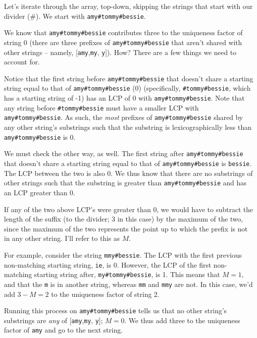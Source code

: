 \documentclass[11pt]{article}
\begin{document}
            Let's iterate through the array, top-down, skipping the strings that start with our divider (\#). We start with \verb|amy#tommy#bessie|.
            
            We know that \verb|amy#tommy#bessie| contributes three to the uniqueness factor of string 0 (there are three prefixes of \verb|amy#tommy#bessie| that aren't shared with other strings -- namely, [\verb|amy|,\verb|my|, \verb|y|]). How? There are a few things we need to account for.
            
            Notice that the first string before \verb|amy#tommy#bessie| that doesn't share a starting string equal to that of \verb|amy#tommy#bessie| (0) (specifically, \verb|#tommy#bessie|, which has a starting string of -1) has an LCP of 0 with \verb|amy#tommy#bessie|. Note that any string before \verb|#tommy#bessie| must have a smaller LCP with \verb|amy#tommy#bessie|. As such, the \textit{most} prefixes of \verb|amy#tommy#bessie| shared by any other string's substrings such that the substring is lexicographically less than \verb|amy#tommy#bessie| is 0.
            
            We must check the other way, as well. The first string after \verb|amy#tommy#bessie| that doesn't share a starting string equal to that of \verb|amy#tommy#bessie| is \verb|bessie|. The LCP between the two is also 0. We thus know that there are no substrings of other strings such that the substring is greater than \verb|amy#tommy#bessie| and has an LCP greater than 0.
            
            If any of the two above LCP's were greater than 0, we would have to subtract the length of the suffix (to the divider; 3 in this case) by the maximum of the two, since the maximum of the two represents the point up to which the prefix is not in any other string. I'll refer to this as $M$.
            
            For example, consider the string \verb|mmy#bessie|. The LCP with the first previous non-matching starting string, \verb|ie|, is 0. However, the LCP of the first non-matching starting string after, \verb|my#tommy#bessie|, is 1. This means that $M=1$, and that the \verb|m| is in another string, whereas \verb|mm| and \verb|mmy| are not. In this case, we'd add $3-M=2$ to the uniqueness factor of string 2.
            
            Running this process on \verb|amy#tommy#bessie| tells us that no other string's substrings are \textit{any} of [\verb|amy|,\verb|my|, \verb|y|]; $M=0$. We thus add three to the uniqueness factor of \verb|amy| and go to the next string. 
            
\end{document}
